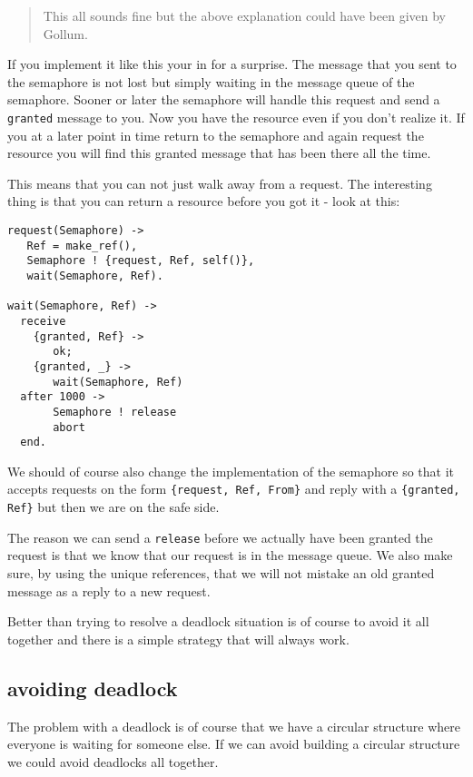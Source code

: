 \documentclass[a4paper,11pt]{article}
\begin{document}
\begin{quotation}
This all sounds fine but the above explanation could have been given
by Gollum.
\end{quotation}

If you implement it like this your in for a surprise. The message that
you sent to the semaphore is not lost but simply waiting in the
message queue of the semaphore. Sooner or later the semaphore will
handle this request and send a {\tt granted} message to you. Now you
have the resource even if you don't realize it. If you at a later point
in time return to the semaphore and again request the resource you
will find this granted message that has been there all the time. 

This means that you can not just walk away from a request. The
interesting thing is that you can return a resource before you got it
- look at this:

\begin{verbatim}
request(Semaphore) ->
   Ref = make_ref(),
   Semaphore ! {request, Ref, self()},
   wait(Semaphore, Ref).

wait(Semaphore, Ref) ->
  receive 
    {granted, Ref} ->
       ok;
    {granted, _} ->
       wait(Semaphore, Ref)
  after 1000 ->
       Semaphore ! release
       abort
  end.
\end{verbatim}

We should of course also change the implementation of the semaphore so
that it accepts requests on the form {\tt \{request, Ref, From\}} and
reply with a {\tt \{granted, Ref\}} but then we are on the safe side.

The reason we can send a {\tt release} before we actually have been
granted the request is that we know that our request is in the message
queue. We also make sure, by using the unique references, that we will
not mistake an old granted message as a reply to a new request. 

Better than trying to resolve a deadlock situation is of course to
avoid it all together and there is a simple strategy that will always work. 


\subsection{avoiding deadlock}

The problem with a deadlock is of course that we have a circular
structure where everyone is waiting for someone else. If we can avoid
building a circular structure we could avoid deadlocks all together.
\end{document}
